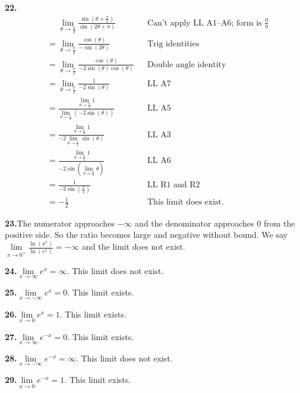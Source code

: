 \documentclass[10pt,oneside,]{book}
\theoremstyle{plain}
\theoremstyle{definition}
\numberwithin{equation}{section}
\newcommand{\fe}[2]{#1\mathopen{}\left(#2\right)\mathclose{}}
\begin{document}
\noindent\textbf{22.}\quad{}\begin{align*}
&\phantom{={}}\lim\limits_{\theta\to\frac{\pi}{2}}\frac{\fe{\sin}{\theta+\frac{\pi}{2}}}{\fe{\sin}{2\theta+\pi}}&&\text{Can't apply LL A1--A6; form is $\tfrac{0}{0}$}\\
&=\lim\limits_{\theta\to\frac{\pi}{2}}\frac{\fe{\cos}{\theta}}{-\fe{\sin}{2\theta}}&&\text{Trig identities}\\
&=\lim\limits_{\theta\to\frac{\pi}{2}}\frac{\fe{\cos}{\theta}}{-2\fe{\sin}{\theta}\fe{\cos}{\theta}}&&\text{Double angle identity}\\
&=\lim\limits_{\theta\to\frac{\pi}{2}}\frac{1}{-2\fe{\sin}{\theta}}&&\text{LL A7}\\
&=\frac{\lim\limits_{\theta\to\frac{\pi}{2}}1}{\lim\limits_{\theta\to\frac{\pi}{2}}\left(-2\fe{\sin}{\theta}\right)}&&\text{LL A5}\\
&=\frac{\lim\limits_{\theta\to\frac{\pi}{2}}1}{-2\lim\limits_{\theta\to\frac{\pi}{2}}\fe{\sin}{\theta}}&&\text{LL A3}\\
&=\frac{\lim\limits_{\theta\to\frac{\pi}{2}}1}{-2\fe{\sin}{\lim\limits_{\theta\to\frac{\pi}{2}}\theta}}&&\text{LL A6}\\
&=\frac{1}{-2\fe{\sin}{\frac{\pi}{2}}}&&\text{LL R1 and R2}\\
&=-\frac{1}{2}&&\text{This limit does exist.}
\end{align*}%
\par\smallskip
\noindent\textbf{23.}\quad{}The numerator approaches \(-\infty\) and the denominator approaches \(0\) from the positive side. So the ratio becomes large and negative without bound. We say \(\lim\limits_{x\to0^{+}}\frac{\fe{\ln}{x^e}}{\fe{\ln}{e^x}}=-\infty\) and the limit does not exist.%
\par\smallskip
\noindent\textbf{24.}\quad{}\(\lim\limits_{x\to\infty}e^x=\infty\). This limit does not exist.%
\par\smallskip
\noindent\textbf{25.}\quad{}\(\lim\limits_{x\to-\infty}e^x=0\). This limit exists.%
\par\smallskip
\noindent\textbf{26.}\quad{}\(\lim\limits_{x\to0}e^x=1\). This limit exists.%
\par\smallskip
\noindent\textbf{27.}\quad{}\(\lim\limits_{x\to\infty}e^{-x}=0\). This limit exists.%
\par\smallskip
\noindent\textbf{28.}\quad{}\(\lim\limits_{x\to-\infty}e^{-x}=\infty\). This limit does not exist.%
\par\smallskip
\noindent\textbf{29.}\quad{}\(\lim\limits_{x\to0}e^{-x}=1\). This limit exists.%
\end{document}
